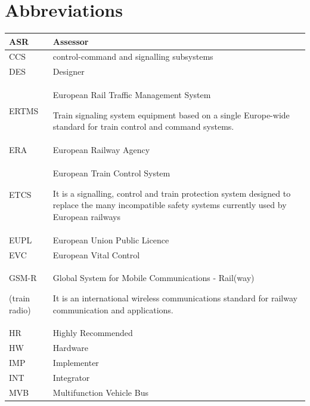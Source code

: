\documentclass{template/openetcs_article}
\begin{document}
\section*{Abbreviations}
\tablehead{}
\tabletail{}
\tablelasttail{}
\begin{supertabular}{|m{3cm}m{11cm}|}
\hline
ASR &
Assessor\\\hline
CCS &
control-command and signalling subsystems  \\\hline
DES &
Designer\\\hline
ERTMS &
European Rail Traffic Management System

Train signaling system equipment based on a single Europe-wide standard for train control and command systems.\\\hline
ERA &
European Railway Agency\\\hline
ETCS &
European Train Control System

It is a signalling, control and train protection system designed to replace the many incompatible safety systems currently used by European railways\\\hline
EUPL &
European Union Public Licence\\\hline
EVC &
European Vital Control\\\hline
GSM-R

(train radio) &
Global System for Mobile Communications - Rail(way)

It is an international wireless communications standard for railway communication and applications.\\\hline
HR &
Highly Recommended\\\hline
HW &
Hardware\\\hline
IMP &
Implementer\\\hline
INT &
Integrator\\\hline
MVB &
Multifunction Vehicle Bus


\end{supertabular}
\end{document}
